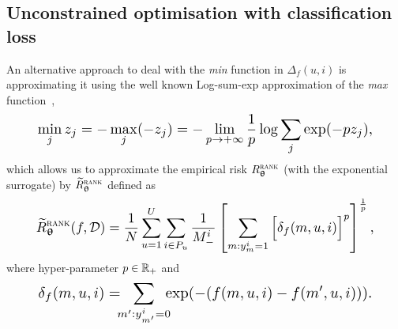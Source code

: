 %

%




\subsection{Unconstrained optimisation with classification loss}

An alternative approach to deal with the \emph{min} function in $\Delta_f(u, i)$ 
is approximating it using the well known Log-sum-exp approximation 
of the \emph{max} function~\cite[p. 72]{boyd2004convex},
\begin{equation}
\label{eq:minappox}
\resizebox{.88\columnwidth}{!}{$
  \displaystyle \min_j z_j 
= \displaystyle -\max_j (-z_j) 
= \displaystyle -\lim_{p \to +\infty} \frac{1}{p} \log \sum_j \exp(-p z_j),
$}
\end{equation}
which allows us to approximate the empirical risk $R_{{\bm{\uptheta}}}^{\textsc{rank}}$ (with the exponential surrogate)
by $\widetilde R_{{\bm{\uptheta}}}^{\textsc{rank}}$ defined as
\begin{equation}
\label{eq:rankapprox}
\resizebox{.888\columnwidth}{!}{$
\begin{aligned}
\widetilde R_{\upthetabm}^{\textsc{rank}}(f, \DCal)
= \frac{1}{N} \sum_{u=1}^U \sum_{i \in P_u} \frac{1}{M_-^i} \left[
  \sum_{m: y_m^i = 1} \Big[ \delta_f(m, u, i) \Big]^p \right]^\frac{1}{p},
\end{aligned}
$}
\end{equation}
where hyper-parameter $p \in \mathbb{R}_+$ and
$$
\resizebox{.88\columnwidth}{!}{$
\displaystyle
\delta_f(m, u, i) = \!\!\! \sum_{m': y_{m'}^i = 0} \!\!\! \exp(-(f(m, u, i) - f(m', u, i))).
$}
$$


